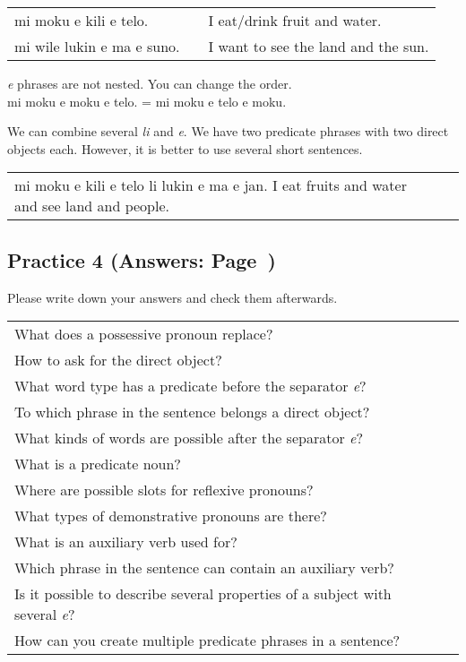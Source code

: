 \begin{supertabular}{p{5,5cm}|ll}
mi moku e kili e telo. && I eat/drink fruit and water. \\
mi wile lukin e ma e suno. && I want to see the land and the sun. \\
\end{supertabular}
 
\textit{e} phrases are not nested. You can change the order. \\
mi moku e moku e telo. = mi moku e telo e moku. 

We can combine several \textit{li} and \textit{e}.
We have two predicate phrases with two direct objects each. 
However, it is better to use several short sentences. 

\begin{supertabular}{p{5,5cm}|ll}
mi moku e kili e telo li lukin e ma e jan. I eat fruits and water and see land and people. \\
\end{supertabular} 

%
\newpage
\subsection*{Practice 4 (Answers: Page~\pageref{'direct_objects_compund_sentences'})}
%
Please write down your answers and check them afterwards. 

\begin{supertabular}{p{5,5cm}|ll}
What does a possessive pronoun replace? && \\ %
How to ask for the direct object? &&  \\ %
What word type has a predicate before the separator \textit{e}?  &&  \\ %
To which phrase in the sentence belongs a direct object? &&  \\ %
What kinds of words are possible after the separator \textit{e}?  &&  \\ %
What is a predicate noun?  &&  \\ %
Where are possible slots for reflexive pronouns? &&  \\ %
What types of demonstrative pronouns are there? &&  \\ %
What is an auxiliary verb used for?  &&   \\ %
Which phrase in the sentence can contain an auxiliary verb? &&   \\ %
Is it possible to describe several properties of a subject with several \textit{e}? &&  \\ %
How can you create multiple predicate phrases in a sentence?  &&  \\ %
\end{supertabular} 

